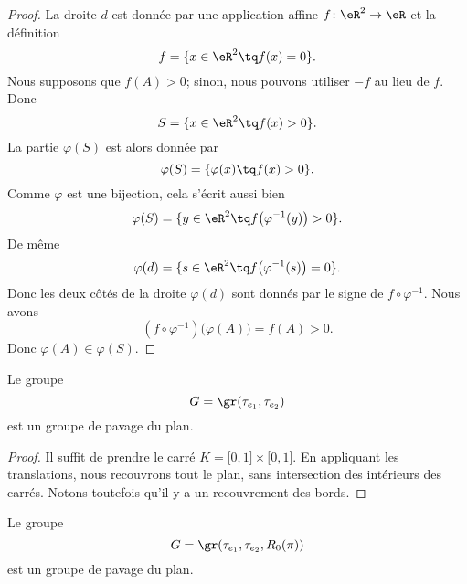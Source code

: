 \begin{proof}
	La droite \( d\) est donnée par une application affine \( f\colon \eR^2\to \eR\) et la définition
	\begin{equation}
		f=\{ x\in \eR^2\tq f(x)=0 \}.
	\end{equation}
	Nous supposons que \( f(A)>0\); sinon, nous pouvons utiliser \( -f\) au lieu de \( f\). Donc
	\begin{equation}
		S=\{ x\in \eR^2\tq f(x)>0 \}.
	\end{equation}
	La partie \( \varphi(S)\) est alors donnée par
	\begin{equation}
		\varphi(S)=\{ \varphi(x)\tq f(x)>0 \}.
	\end{equation}
	Comme \( \varphi\) est une bijection, cela s'écrit aussi bien
	\begin{equation}
		\varphi(S)=\{ y\in \eR^2\tq f\big( \varphi^{-1}(y) \big)>0 \}.
	\end{equation}
	De même
	\begin{equation}
		\varphi(d)=\{ s\in \eR^2\tq f\big( \varphi^{-1}(s) \big)=0 \}.
	\end{equation}
	Donc les deux côtés de la droite \( \varphi(d)\) sont donnés par le signe de \( f\circ \varphi^{-1}\). Nous avons
	\begin{equation}
		(f\circ\varphi^{-1})\big( \varphi(A) \big)=f(A)>0.
	\end{equation}
	Donc \( \varphi(A)\in \varphi(S)\).
\end{proof}

\begin{lemma}           \label{LEMooZOXVooTJiLTF}
	Le groupe
	\begin{equation}
		G=\gr(\tau_{e_1}, \tau_{e_2})
	\end{equation}
	est un groupe de pavage du plan.
\end{lemma}

\begin{proof}
	Il suffit de prendre le carré \( K=\mathopen[ 0 , 1 \mathclose]\times \mathopen[ 0 , 1 \mathclose]\). En appliquant les translations, nous recouvrons tout le plan, sans intersection des intérieurs des carrés. Notons toutefois qu'il y a un recouvrement des bords.
\end{proof}

\begin{lemma}    \label{LEMooTMRGooChBzZg}
	Le groupe
	\begin{equation}
		G=\gr(\tau_{e_1}, \tau_{e_2}, R_0(\pi))
	\end{equation}
	est un groupe de pavage du plan.
\end{lemma}

